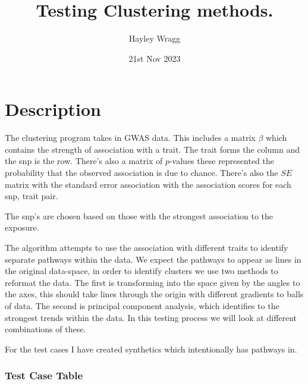 \documentclass[
]{article}
\title{Testing Clustering methods.}
\author{Hayley Wragg}
\date{21st Nov 2023}
\begin{document}
\maketitle

\hypertarget{description}{%
\section{Description}\label{description}}

The clustering program takes in GWAS data. This includes a matrix
\(\beta\) which contains the strength of association with a trait. The
trait forms the column and the snp is the row. There's also a matrix of
\(p\)-values these represented the probability that the observed
association is due to chance. There's also the \(SE\) matrix with the
standard error association with the association scores for each snp,
trait pair.

The snp's are chosen based on those with the strongest association to
the exposure.

The algorithm attempts to use the association with different traits to
identify separate pathways within the data. We expect the pathways to
appear as lines in the original data-space, in order to identify
clusters we use two methods to reformat the data. The first is
transforming into the space given by the angles to the axes, this should
take lines through the origin with different gradients to balls of data.
The second is principal component analysis, which identifies to the
strongest trends within the data. In this testing process we will look
at different combinations of these.

For the test cases I have created synthetics which intentionally has
pathways in.

\hypertarget{test-case-table}{%
\subsubsection{Test Case Table}\label{test-case-table}}
\end{document}
